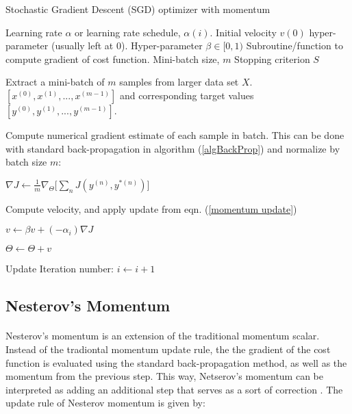 \documentclass[12pt,letterpaper]{article}
\begin{document}
\begin{algorithm}
\caption{Stochastic Gradient Descent (SGD) optimizer with momentum}
\label{algSGD}

\begin{algorithmic}

\REQUIRE Learning rate $\alpha$ or learning rate schedule, $\alpha(i)$.
\REQUIRE Initial velocity $v(0)$ hyper-parameter (usually left at $0$).
\REQUIRE Hyper-parameter $\beta \in [0,1)$
\REQUIRE Subroutine/function to compute gradient of cost function.
\REQUIRE Mini-batch size, $m$
\REQUIRE Stopping criterion $S$

	\item Extract a mini-batch of $m$ samples from larger data set $X$. $[x^{(0)},x^{(1)},...,x^{(m-1)}]$ and corresponding target values 
	$[y^{(0)},y^{(1)},...,y^{(m-1)}]$.
	\item Compute numerical gradient estimate of each sample in batch. This can be done with standard back-propagation in algorithm (\ref{algBackProp}) and 			 	normalize by batch size $m$:
	\item $\nabla J \leftarrow \frac{1}{m}\nabla_{\Theta} \Big[ \sum_n J(y^{(n)},y^{*(n)}) \Big] $
	\item Compute velocity, and apply update from eqn. (\ref{momentum update})
	\item $v \leftarrow \beta v + (-\alpha_i)\nabla J$
	\item $\Theta \leftarrow \Theta + v$
	\item Update Iteration number: $i \leftarrow i + 1$
\ENDWHILE

\end{algorithmic}
\end{algorithm}

\subsection{Nesterov's Momentum}

\paragraph*{}Nesterov's momentum is an extension of the traditional momentum scalar. Instead of the tradiontal momentum update rule, the the gradient of the cost function is evaluated using the standard back-propagation method, as well as the momentum from the previous step. This way, Netserov's momentum can be interpreted as adding an additional step  that serves as a sort of correction \cite{Geron,Goodfellow}. The update rule of Nesterov momentum is given by:
\end{document}
